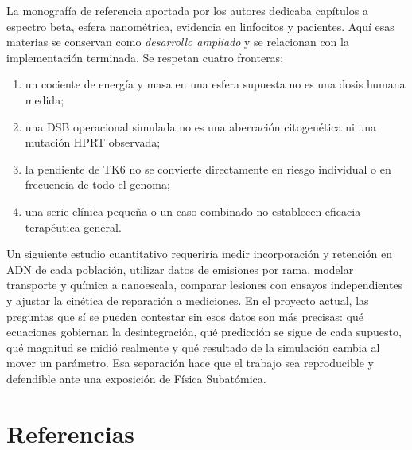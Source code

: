 \documentclass[11pt,a4paper,oneside]{article}
\begin{document}
La monografía de referencia aportada por los autores dedicaba capítulos
a espectro beta, esfera nanométrica, evidencia en linfocitos y pacientes.
Aquí esas materias se conservan como \emph{desarrollo ampliado} y se
relacionan con la implementación terminada. Se respetan cuatro fronteras:
\begin{enumerate}[leftmargin=*,itemsep=2pt]
\item un cociente de energía y masa en una esfera supuesta no es una dosis
      humana medida;
\item una DSB operacional simulada no es una aberración citogenética ni una
      mutación HPRT observada;
\item la pendiente de TK6 no se convierte directamente en riesgo individual
      o en frecuencia de todo el genoma;
\item una serie clínica pequeña o un caso combinado no establecen eficacia
      terapéutica general.
\end{enumerate}

Un siguiente estudio cuantitativo requeriría medir incorporación y
retención en ADN de cada población, utilizar datos de emisiones por rama,
modelar transporte y química a nanoescala, comparar lesiones con ensayos
independientes y ajustar la cinética de reparación a mediciones. En el
proyecto actual, las preguntas que sí se pueden contestar sin esos datos
son más precisas: qué ecuaciones gobiernan la desintegración, qué
predicción se sigue de cada supuesto, qué magnitud se midió realmente y
qué resultado de la simulación cambia al mover un parámetro. Esa
separación hace que el trabajo sea reproducible y defendible ante una
exposición de Física Subatómica.

\section{Referencias}\label{referencias}
\end{document}

